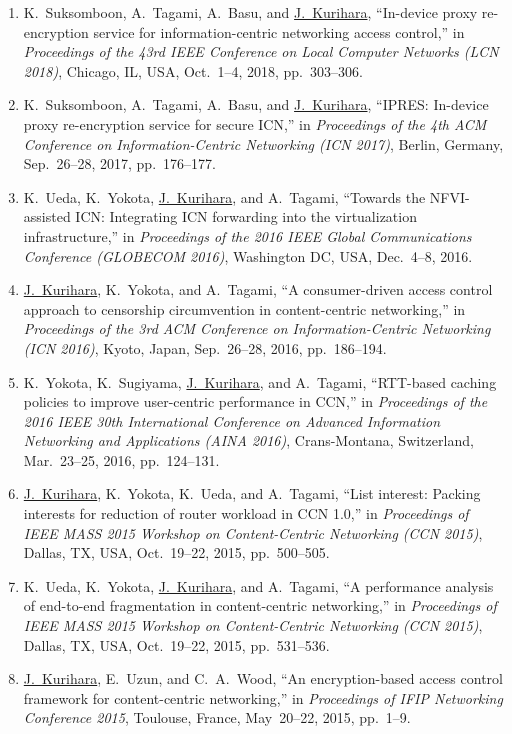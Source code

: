 \begin{enumerate}
  \item K.~Suksomboon, A.~Tagami, A.~Basu, and \underline{J.~Kurihara}, ``In-device proxy re-encryption service for information-centric networking access control,'' in \textit{Proceedings of the 43rd IEEE Conference on Local Computer Networks (LCN 2018)}, Chicago, IL, USA, Oct.~1--4, 2018, pp.~303--306.
  \item K.~Suksomboon, A.~Tagami, A.~Basu, and \underline{J.~Kurihara}, ``IPRES: In-device proxy re-encryption service for secure ICN,'' in \textit{Proceedings of the 4th ACM Conference on Information-Centric Networking (ICN 2017)}, Berlin, Germany, Sep.~26--28, 2017, pp.~176--177.
  \item K.~Ueda, K.~Yokota, \underline{J.~Kurihara}, and A.~Tagami, ``Towards the NFVI-assisted ICN: Integrating ICN forwarding into the virtualization infrastructure,'' in \textit{Proceedings of the 2016 IEEE Global Communications Conference (GLOBECOM 2016)}, Washington DC, USA, Dec.~4--8, 2016.
  \item \underline{J.~Kurihara}, K.~Yokota, and A.~Tagami, ``A consumer-driven access control approach to censorship circumvention in content-centric networking,'' in \textit{Proceedings of the 3rd ACM Conference on Information-Centric Networking (ICN 2016)}, Kyoto, Japan, Sep.~26--28, 2016, pp.~186--194.
  \item K.~Yokota, K.~Sugiyama, \underline{J.~Kurihara}, and A.~Tagami, ``RTT-based caching policies to improve user-centric performance in CCN,'' in \textit{Proceedings of the 2016 IEEE 30th International Conference on Advanced Information Networking and Applications (AINA 2016)}, Crans-Montana, Switzerland, Mar.~23--25, 2016, pp.~124--131.
  \item \underline{J.~Kurihara}, K.~Yokota, K.~Ueda, and A.~Tagami, ``List interest: Packing interests for reduction of router workload in CCN 1.0,'' in \textit{Proceedings of IEEE MASS 2015 Workshop on Content-Centric Networking (CCN 2015)}, Dallas, TX, USA, Oct.~19--22, 2015, pp.~500--505.
  \item K.~Ueda, K.~Yokota, \underline{J.~Kurihara}, and A.~Tagami, ``A performance analysis of end-to-end fragmentation in content-centric networking,'' in \textit{Proceedings of IEEE MASS 2015 Workshop on Content-Centric Networking (CCN 2015)}, Dallas, TX, USA, Oct.~19--22, 2015, pp.~531--536.
  \item \underline{J.~Kurihara}, E.~Uzun, and C.~A.~Wood, ``An encryption-based access control framework for content-centric networking,'' in \textit{Proceedings of IFIP Networking Conference 2015}, Toulouse, France, May~20--22, 2015, pp.~1--9.

\end{enumerate}
